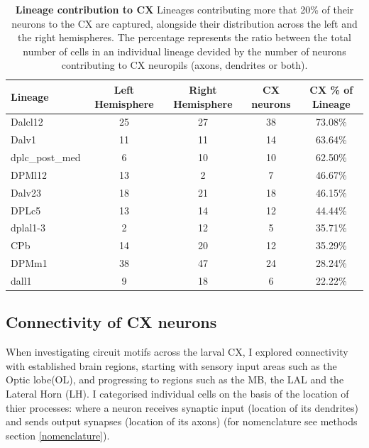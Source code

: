     \begin{table}[h!] [!htbp]
    \centering
    \begin{tabular}{|l|c|c|c|c|}
    \hline
    \textbf{Lineage} & \textbf{Left Hemisphere} & \textbf{Right Hemisphere} & \textbf{CX neurons} & \textbf{CX \% of Lineage} \\
    \hline
    Dalcl12 & 25 & 27 & 38 & \cellcolor{forest5}73.08\% \\
    Dalv1 & 11 & 11 & 14 & \cellcolor{forest4}63.64\% \\
    dplc\_post\_med & 6 & 10 & 10 & \cellcolor{forest4}62.50\% \\
    DPMl12 & 13 & 2 & 7 & \cellcolor{forest3}46.67\% \\
    Dalv23 & 18 & 21 & 18 & \cellcolor{forest3}46.15\% \\
    DPLc5 & 13 & 14 & 12 & \cellcolor{forest3}44.44\% \\
    dplal1-3 & 2 & 12 & 5 & \cellcolor{forest2}35.71\% \\
    CPb & 14 & 20 & 12 & \cellcolor{forest2}35.29\% \\
    DPMm1 & 38 & 47 & 24 & \cellcolor{forest1}28.24\% \\
    dall1 & 9 & 18 & 6 & \cellcolor{forest1}22.22\% \\
    \hline
    \end{tabular}
    \caption[Contribution of lineages to CX]{\textbf{Lineage contribution to CX}  Lineages contributing more that 20\% of their neurons to the CX are captured, alongside their distribution across the left and the right hemispheres. The percentage represents the ratio between the total number of cells in an individual lineage devided by the number of neurons contributing to CX neuropils (axons, dendrites or both). }
    \label{cx_percentage}
        \end{table}

    \subsection{Connectivity of CX neurons}
    When investigating circuit motifs across the larval CX, I explored connectivity with established brain regions, starting with sensory input areas such as the Optic lobe(OL), and progressing to regions such as the MB, the LAL and the Lateral Horn (LH).  I categorised individual cells on the basis of the location of thier processes:  where a neuron receives synaptic input (location of its dendrites) and sends output synapses (location of its axons) (for nomenclature see methods section \ref{nomenclature}).

